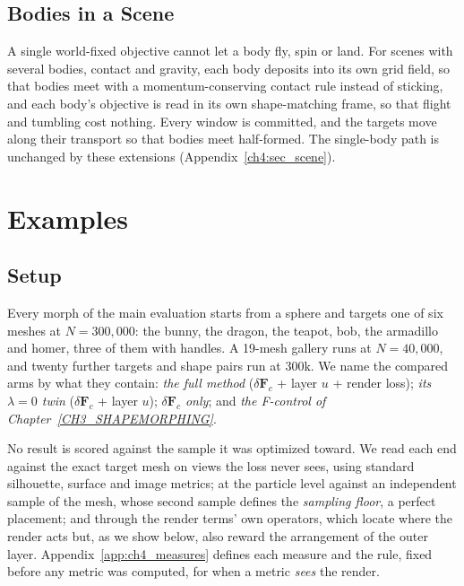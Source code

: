 \subsection{Bodies in a Scene}
A single world-fixed objective cannot let a body fly, spin or land. For scenes with several bodies, contact and gravity,
each body deposits into its own grid field, so that bodies meet with a momentum-conserving contact rule instead of
sticking, and each body's objective is read in its own shape-matching frame, so that flight and tumbling cost nothing.
Every window is committed, and the targets move along their transport so that bodies meet half-formed. The single-body
path is unchanged by these extensions (Appendix~\ref{ch4:sec_scene}).

\section{Examples}
\label{ch4:sec_examples}

\subsection{Setup}
\label{ch4:sec_protocol}
Every morph of the main evaluation starts from a sphere and targets one of six meshes at $N=300{,}000$: the bunny, the
dragon, the teapot, bob, the armadillo and homer, three of them with handles. A 19-mesh gallery runs at $N=40{,}000$, and
twenty further targets and shape pairs run at 300k. We name the compared arms by what they contain: \emph{the full method}
($\delta\mathbf{F}_c$ + layer $u$ + render loss); \emph{its $\lambda=0$ twin} ($\delta\mathbf{F}_c$ + layer $u$);
\emph{$\delta\mathbf{F}_c$ only}; and \emph{the F-control of Chapter~\ref{CH3_SHAPEMORPHING}}.

No result is scored against the sample it was optimized toward. We read each end against the exact target mesh on views
the loss never sees, using standard silhouette, surface and image metrics; at the particle level against an independent
sample of the mesh, whose second sample defines the \emph{sampling floor}, a perfect placement; and through the render
terms' own operators, which locate where the render acts but, as we show below, also reward the arrangement of the outer
layer. Appendix~\ref{app:ch4_measures} defines each measure and the rule, fixed before any metric was computed, for when a
metric \emph{sees} the render.

